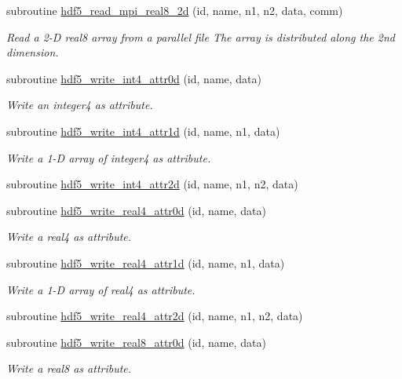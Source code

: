 \begin{DoxyCompactItemize}
subroutine \hyperlink{classmodhdf5_a29c6c1a0c3de14678ed8eebe304b3255}{hdf5\-\_\-read\-\_\-mpi\-\_\-real8\-\_\-2d} (id, name, n1, n2, data, comm)
\begin{DoxyCompactList}\small\item\em Read a 2-\/\-D real8 array from a parallel file The array is distributed along the 2nd dimension. \end{DoxyCompactList}\item 
subroutine \hyperlink{classmodhdf5_a1f5aac5704c10accbb39476926a4a7aa}{hdf5\-\_\-write\-\_\-int4\-\_\-attr0d} (id, name, data)
\begin{DoxyCompactList}\small\item\em Write an integer4 as attribute. \end{DoxyCompactList}\item 
subroutine \hyperlink{classmodhdf5_a41e511ab23277132cad7aa447804eee4}{hdf5\-\_\-write\-\_\-int4\-\_\-attr1d} (id, name, n1, data)
\begin{DoxyCompactList}\small\item\em Write a 1-\/\-D array of integer4 as attribute. \end{DoxyCompactList}\item 
subroutine \hyperlink{classmodhdf5_a902380b589c35be03e33f0ae8ebdc0dc}{hdf5\-\_\-write\-\_\-int4\-\_\-attr2d} (id, name, n1, n2, data)
\item 
subroutine \hyperlink{classmodhdf5_abadf683caad48e7acd96f916246bf778}{hdf5\-\_\-write\-\_\-real4\-\_\-attr0d} (id, name, data)
\begin{DoxyCompactList}\small\item\em Write a real4 as attribute. \end{DoxyCompactList}\item 
subroutine \hyperlink{classmodhdf5_a6158884984b6690aad27d75c6d5f58a7}{hdf5\-\_\-write\-\_\-real4\-\_\-attr1d} (id, name, n1, data)
\begin{DoxyCompactList}\small\item\em Write a 1-\/\-D array of real4 as attribute. \end{DoxyCompactList}\item 
subroutine \hyperlink{classmodhdf5_ad682a858bcaec8fcd21f646d44d76208}{hdf5\-\_\-write\-\_\-real4\-\_\-attr2d} (id, name, n1, n2, data)
\item 
subroutine \hyperlink{classmodhdf5_a28db26cc0b827091ab455d2419c88b10}{hdf5\-\_\-write\-\_\-real8\-\_\-attr0d} (id, name, data)
\begin{DoxyCompactList}\small\item\em Write a real8 as attribute. \end{DoxyCompactList}\item 

\end{DoxyCompactItemize}
